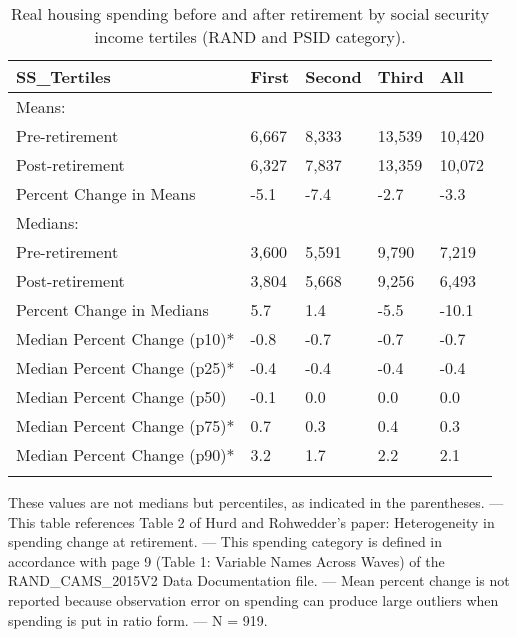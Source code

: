 \begin{table}[tbp] \centering
{}

\caption{Real housing spending before and after retirement by social security income tertiles (RAND and PSID category).}
\begin{tabularx}{\textwidth}{lCCCC}

\toprule
{SS\_Tertiles}&{First}&{Second}&{Third}&{All} \tabularnewline
\midrule\addlinespace[1.5ex]
Means:&&&& \tabularnewline
\midrule Pre-retirement&6,667&8,333&13,539&10,420 \tabularnewline
Post-retirement&6,327&7,837&13,359&10,072 \tabularnewline
Percent Change in Means&-5.1&-7.4&-2.7&-3.3 \tabularnewline
\midrule Medians:&&&& \tabularnewline
\midrule Pre-retirement&3,600&5,591&9,790&7,219 \tabularnewline
Post-retirement&3,804&5,668&9,256&6,493 \tabularnewline
Percent Change in Medians&5.7&1.4&-5.5&-10.1 \tabularnewline
Median Percent Change (p10)*&-0.8&-0.7&-0.7&-0.7 \tabularnewline
Median Percent Change (p25)*&-0.4&-0.4&-0.4&-0.4 \tabularnewline
Median Percent Change (p50)&-0.1&0.0&0.0&0.0 \tabularnewline
Median Percent Change (p75)*&0.7&0.3&0.4&0.3 \tabularnewline
Median Percent Change (p90)*&3.2&1.7&2.2&2.1 \tabularnewline
\bottomrule \addlinespace[1.5ex]

\end{tabularx}
\begin{flushleft}
\footnotesize *These values are not medians but percentiles, as indicated in the parentheses. \linebreak --- \linebreak This table references Table 2 of Hurd and Rohwedder's paper: Heterogeneity in spending change at retirement. \linebreak --- \linebreak This spending category is defined in accordance with page 9 (Table 1: Variable Names Across Waves) of the RAND\_CAMS\_2015V2 Data Documentation file. \linebreak --- \linebreak Mean percent change is not reported because observation error on spending can produce large outliers when spending is put in ratio form. \linebreak --- \linebreak N = 919.
\end{flushleft}
\end{table}
